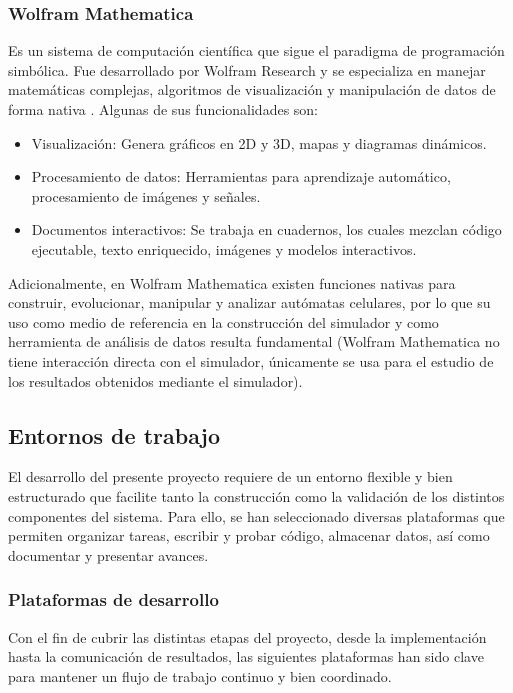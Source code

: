 \subsubsection{Wolfram Mathematica}

Es un sistema de computación científica que sigue el paradigma de programación simbólica. Fue desarrollado por Wolfram Research y se especializa en manejar matemáticas complejas, algoritmos de visualización y manipulación de datos de forma nativa \cite{mathematica_2024}. Algunas de sus funcionalidades son:
\begin{itemize}
	\item Visualización: Genera gráficos en 2D y 3D, mapas y diagramas dinámicos.
	
	\item Procesamiento de datos: Herramientas para aprendizaje automático, procesamiento de imágenes y señales.
	
	\item Documentos interactivos: Se trabaja en cuadernos, los cuales mezclan código ejecutable, texto enriquecido, imágenes y modelos interactivos.
\end{itemize}

Adicionalmente, en Wolfram Mathematica existen funciones nativas para construir, evolucionar, manipular y analizar autómatas celulares, por lo que su uso como medio de referencia en la construcción del simulador y como herramienta de análisis de datos resulta fundamental (Wolfram Mathematica no tiene interacción directa con el simulador, únicamente se usa para el estudio de los resultados obtenidos mediante el simulador).

\subsection{Entornos de trabajo}

El desarrollo del presente proyecto requiere de un entorno flexible y bien estructurado que facilite tanto la construcción como la validación de los distintos componentes del sistema. Para ello, se han seleccionado diversas plataformas que permiten organizar tareas, escribir y probar código, almacenar datos, así como documentar y presentar avances.

\subsubsection{Plataformas de desarrollo}

Con el fin de cubrir las distintas etapas del proyecto, desde la implementación hasta la comunicación de resultados, las siguientes plataformas han sido clave para mantener un flujo de trabajo continuo y bien coordinado.

